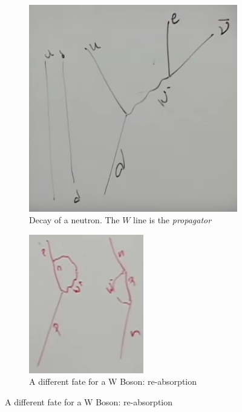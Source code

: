 \documentclass[]{article}
\begin{document}
\begin{figure}[H]
	\caption{Possible fates of a W boson}
	\begin{subfigure}[t]{0.5\textwidth}
		\caption{Decay of a neutron. The $W$ line is the \emph{propagator}}\label{fig:2-6-W1}
		\includegraphics[width=\textwidth]{2-6-W1}
	\end{subfigure}
	\begin{subfigure}[t]{0.4\textwidth}
		\caption{A different fate for a W Boson: re-absorption}\label{fig:absorption:W:boson}
		\includegraphics[width=\textwidth]{2-6-W2}
	\end{subfigure}
\end{figure}
\end{document}
